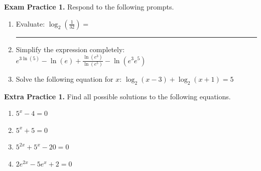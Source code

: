 \documentclass[10pt]{article}
\begin{document}
{\bf\color{blue}Exam Practice 1.} \reversemarginpar {}
%
Respond to the following prompts.
\begin{enumerate}
    
        \item[(a)] Evaluate: \quad $\displaystyle \log_{2} \left( \frac{1}{32} \right)=$\rule[-8pt]{1in}{0.4pt}
        
        
        \item[(b)] Simplify the expression completely: \quad $\displaystyle e^{3 \ln( 5)} - \ln( e ) + \frac{\ln( e^3)}{\ln( e^5)} - \ln( e^3 e^5) $
        
        
        \vfill
    
        \item[(c)] Solve the following equation for $x$: \quad $\displaystyle \log_2(x - 3) + \log_2(x + 1) = 5$
 
        \vfill
        \vfill
       
    \end{enumerate}


\newpage%

{\bf\color{blue}Extra Practice 1.} \reversemarginpar {}
%
Find all possible solutions to the following equations.
\begin{enumerate}
\item[(a)] $5^x-4=0$
    \vfill
\item[(b)] $5^x+5=0$
    \vfill
\item[(c)] $5^{2x}+5^x-20=0$
    \vfill
\item[(d)] $2e^{2x}-5e^x+2=0$
    \vfill
    \vfill
\end{enumerate}
\end{document}

